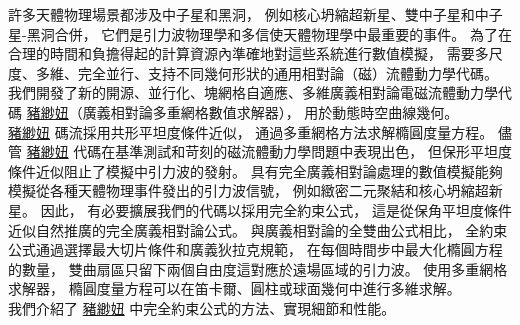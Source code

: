 \begin{abstract_chinese}
\begin{CJK*}{UTF8}{bsmi}
{
許多天體物理場景都涉及中子星和黑洞，
例如核心坍縮超新星、雙中子星和中子星-黑洞合併，
它們是引力波物理學和多信使天體物理學中最重要的事件。
為了在合理的時間和負擔得起的計算資源內準確地對這些系統進行數值模擬，
需要多尺度、多維、完全並行、支持不同幾何形狀的通用相對論（磁）流體動力學代碼。
我們開發了新的開源、並行化、塊網格自適應、多維廣義相對論電磁流體動力學代碼 \underline{豬緲妞}（廣義相對論多重網格數值求解器），
用於動態時空曲線幾何。\\
\underline{豬緲妞} 碼流採用共形平坦度條件近似，
通過多重網格方法求解橢圓度量方程。
儘管 \underline{豬緲妞} 代碼在基準測試和苛刻的磁流體動力學問題中表現出色，
但保形平坦度條件近似阻止了模擬中引力波的發射。
具有完全廣義相對論處理的數值模擬能夠模擬從各種天體物理事件發出的引力波信號，
例如緻密二元聚結和核心坍縮超新星。
因此，
有必要擴展我們的代碼以採用完全約束公式，
這是從保角平坦度條件近似自然推廣的完全廣義相對論公式。
與廣義相對論的全雙曲公式相比，
全約束公式通過選擇最大切片條件和廣義狄拉克規範，
在每個時間步中最大化橢圓方程的數量，
雙曲扇區只留下兩個自由度這對應於遠場區域的引力波。
使用多重網格求解器，
橢圓度量方程可以在笛卡爾、圓柱或球面幾何中進行多維求解。\\
我們介紹了 \underline{豬緲妞} 中完全約束公式的方法、實現細節和性能。}
\end{CJK*}
\end{abstract_chinese}
